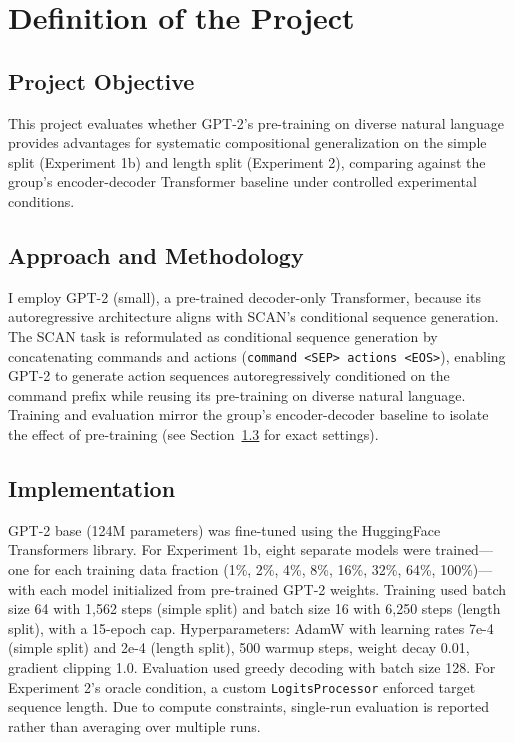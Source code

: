 \documentclass[11pt]{article}
\begin{document}
\section{Definition of the Project}

\subsection{Project Objective}

This project evaluates whether GPT-2's pre-training on diverse natural language provides advantages for systematic compositional generalization on the simple split (Experiment 1b) and length split (Experiment 2), comparing against the group's encoder-decoder Transformer baseline under controlled experimental conditions.

\subsection{Approach and Methodology}

I employ GPT-2 (small), a pre-trained decoder-only Transformer, because its autoregressive architecture aligns with SCAN's conditional sequence generation. The SCAN task is reformulated as conditional sequence generation by concatenating commands and actions (\texttt{command <SEP> actions <EOS>}), enabling GPT-2 to generate action sequences autoregressively conditioned on the command prefix while reusing its pre-training on diverse natural language. Training and evaluation mirror the group's encoder-decoder baseline to isolate the effect of pre-training (see Section~\ref{sec:implementation} for exact settings).

\subsection{Implementation}
\label{sec:implementation}
GPT-2 base (124M parameters) was fine-tuned using the HuggingFace Transformers library. For Experiment 1b, eight separate models were trained---one for each training data fraction (1\%, 2\%, 4\%, 8\%, 16\%, 32\%, 64\%, 100\%)---with each model initialized from pre-trained GPT-2 weights. Training used batch size 64 with 1,562 steps (simple split) and batch size 16 with 6,250 steps (length split), with a 15-epoch cap. Hyperparameters: AdamW with learning rates 7e-4 (simple split) and 2e-4 (length split), 500 warmup steps, weight decay 0.01, gradient clipping 1.0. Evaluation used greedy decoding with batch size 128. For Experiment 2's oracle condition, a custom \texttt{LogitsProcessor} enforced target sequence length. Due to compute constraints, single-run evaluation is reported rather than averaging over multiple runs.
\end{document}

